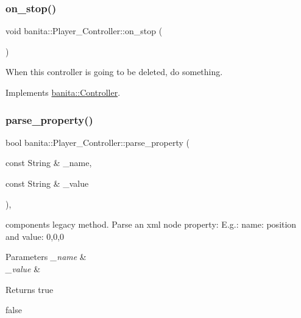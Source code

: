 \mbox{\label{classbanita_1_1_player___controller_aedd233c9dcd10f9c8998f48a840f2e57}} 
\subsubsection{\texorpdfstring{on\_stop()}{on\_stop()}}
{\footnotesize\ttfamily void banita\+::\+Player\+\_\+\+Controller\+::on\+\_\+stop (\begin{DoxyParamCaption}{ }\end{DoxyParamCaption})\hspace{0.3cm}{\ttfamily [virtual]}}



When this controller is going to be deleted, do something. 



Implements \mbox{\hyperlink{classbanita_1_1_controller_a988fb70a657c61afb82f4f4cf25e7c66}{banita\+::\+Controller}}.

\mbox{\label{classbanita_1_1_player___controller_ab25a1e791ce020ff226b6324cc2c5c67}} 
\subsubsection{\texorpdfstring{parse\_property()}{parse\_property()}}
{\footnotesize\ttfamily bool banita\+::\+Player\+\_\+\+Controller\+::parse\+\_\+property (\begin{DoxyParamCaption}\item[{const String \&}]{\+\_\+name,  }\item[{const String \&}]{\+\_\+value }\end{DoxyParamCaption})\hspace{0.3cm}{\ttfamily [override]}, {\ttfamily [virtual]}}



component\textquotesingle{}s legacy method. Parse an xml node property\+: E.\+g.\+: name\+: position and value\+: 0,0,0 


\begin{DoxyParams}{Parameters}
{\em \+\_\+name} & \\
\hline
{\em \+\_\+value} & \\
\hline
\end{DoxyParams}
\begin{DoxyReturn}{Returns}
true 

false 
\end{DoxyReturn}


